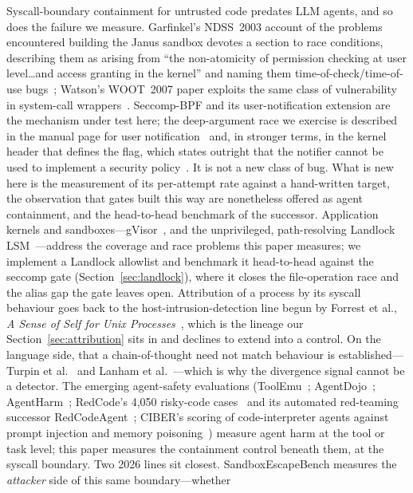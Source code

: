 \documentclass[11pt]{article}
\begin{document}
Syscall-boundary containment for untrusted code predates LLM agents, and so does the failure we
measure. Garfinkel's NDSS~2003 account of the problems encountered building the Janus sandbox
devotes a section to race conditions, describing them as arising from ``the non-atomicity of
permission checking at user level\ldots and access granting in the kernel'' and naming them
time-of-check/time-of-use bugs~\cite{garfinkel03}; Watson's WOOT~2007 paper exploits the same class
of vulnerability in system-call wrappers~\cite{watson07}. Seccomp-BPF and its user-notification extension are the mechanism under
test here; the deep-argument race we exercise is described in the manual page for user
notification~\cite{seccompunotify} and, in stronger terms, in the kernel header that defines the flag,
which states outright that the notifier cannot be used to implement a security
policy~\cite{seccompheader}. It is not a new class of bug. What is new here is the measurement of its
per-attempt rate against a hand-written target, the observation that gates built this way are nonetheless
offered as agent containment, and the head-to-head benchmark of the successor. Application kernels and sandboxes---gVisor~\cite{gvisor}, and the
unprivileged, path-resolving Landlock LSM~\cite{landlock}---address the coverage and race problems this
paper measures; we implement a Landlock allowlist and benchmark it head-to-head against the seccomp gate
(Section~\ref{sec:landlock}), where it closes the file-operation race and the alias gap the gate leaves
open. Attribution of a process by its syscall behaviour goes back to the
host-intrusion-detection line begun by Forrest et al., \emph{A Sense of Self for Unix Processes}~\cite{forrest96},
which is the lineage our Section~\ref{sec:attribution} sits in and declines to extend into a control. On the
language side, that a chain-of-thought need not match behaviour is established---Turpin et
al.~\cite{turpin23} and Lanham et al.~\cite{lanham23}---which is why the divergence signal cannot be a
detector. The emerging agent-safety evaluations (ToolEmu~\cite{toolemu}; AgentDojo~\cite{agentdojo};
AgentHarm~\cite{agentharm}; RedCode's 4{,}050 risky-code cases~\cite{redcode} and its automated
red-teaming successor RedCodeAgent~\cite{redcodeagent}; CIBER's scoring of code-interpreter agents
against prompt injection and memory poisoning~\cite{ciber}) measure agent harm at the tool or task
level; this paper measures the containment control beneath them, at the syscall boundary. Two 2026
lines sit closest. SandboxEscapeBench measures the \emph{attacker} side of this same boundary---whether
\end{document}
